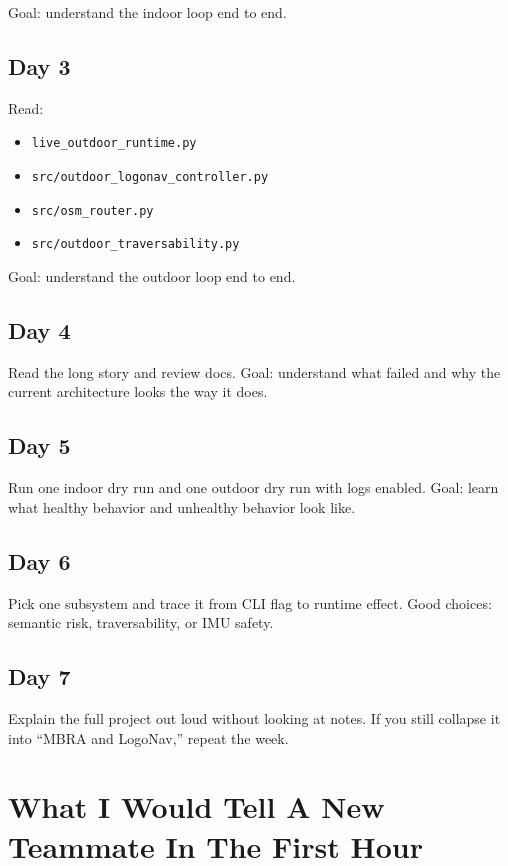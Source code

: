 \documentclass[11pt]{article}
\begin{document}
Goal: understand the indoor loop end to end.

\subsection*{Day 3}

Read:

\begin{itemize}[nosep]
  \item \texttt{live\_outdoor\_runtime.py}
  \item \texttt{src/outdoor\_logonav\_controller.py}
  \item \texttt{src/osm\_router.py}
  \item \texttt{src/outdoor\_traversability.py}
\end{itemize}

Goal: understand the outdoor loop end to end.

\subsection*{Day 4}

Read the long story and review docs. Goal: understand what failed and why the
current architecture looks the way it does.

\subsection*{Day 5}

Run one indoor dry run and one outdoor dry run with logs enabled. Goal: learn what
healthy behavior and unhealthy behavior look like.

\subsection*{Day 6}

Pick one subsystem and trace it from CLI flag to runtime effect. Good choices:
semantic risk, traversability, or IMU safety.

\subsection*{Day 7}

Explain the full project out loud without looking at notes. If you still collapse it
into ``MBRA and LogoNav,'' repeat the week.

\section{What I Would Tell A New Teammate In The First Hour}
\end{document}
